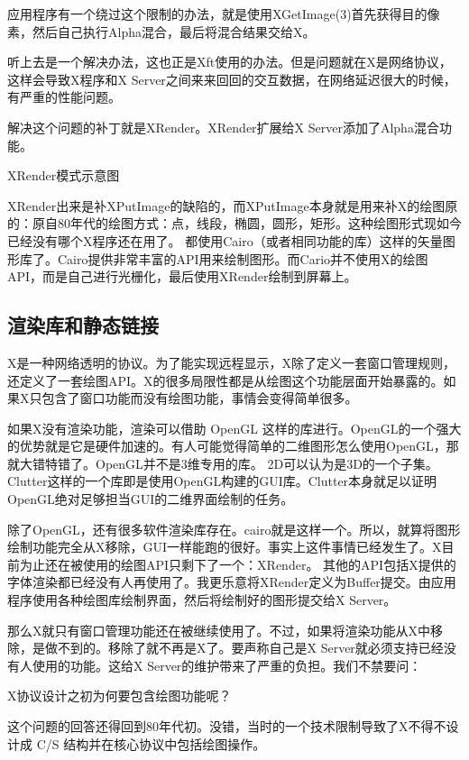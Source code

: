 \documentclass[amstex,twoside]{ctexbook}
\begin{document}
应用程序有一个绕过这个限制的办法，就是使用XGetImage(3)首先获得目的像素，然后自己执行Alpha混合，最后将混合结果交给X。

听上去是一个解决办法，这也正是Xft使用的办法。但是问题就在X是网络协议，这样会导致X程序和X Server之间来来回回的交互数据，在网络延迟很大的时候，有严重的性能问题。

解决这个问题的补丁就是XRender。XRender扩展给X Server添加了Alpha混合功能。


XRender模式示意图

XRender出来是补XPutImage的缺陷的，而XPutImage本身就是用来补X的绘图原的：原自80年代的绘图方式：点，线段，椭圆，圆形，矩形。这种绘图形式现如今已经没有哪个X程序还在用了。
都使用Cairo（或者相同功能的库）这样的矢量图形库了。Cairo提供非常丰富的API用来绘制图形。而Cario并不使用X的绘图API，而是自己进行光栅化，最后使用XRender绘制到屏幕上。


\subsection{渲染库和静态链接}

X是一种网络透明的协议。为了能实现远程显示，X除了定义一套窗口管理规则，还定义了一套绘图API。X的很多局限性都是从绘图这个功能层面开始暴露的。如果X只包含了窗口功能而没有绘图功能，事情会变得简单很多。

如果X没有渲染功能，渲染可以借助 OpenGL 这样的库进行。OpenGL的一个强大的优势就是它是硬件加速的。有人可能觉得简单的二维图形怎么使用OpenGL，那就大错特错了。OpenGL并不是3维专用的库。
2D可以认为是3D的一个子集。Clutter这样的一个库即是使用OpenGL构建的GUI库。Clutter本身就足以证明OpenGL绝对足够担当GUI的二维界面绘制的任务。

除了OpenGL，还有很多软件渲染库存在。cairo就是这样一个。所以，就算将图形绘制功能完全从X移除，GUI一样能跑的很好。事实上这件事情已经发生了。X目前为止还在被使用的绘图API只剩下了一个：XRender。
其他的API包括X提供的字体渲染都已经没有人再使用了。我更乐意将XRender定义为Buffer提交。由应用程序使用各种绘图库绘制界面，然后将绘制好的图形提交给X Server。

那么X就只有窗口管理功能还在被继续使用了。不过，如果将渲染功能从X中移除，是做不到的。移除了就不再是X了。要声称自己是X Server就必须支持已经没有人使用的功能。这给X Server的维护带来了严重的负担。我们不禁要问：

\begin{center}
X协议设计之初为何要包含绘图功能呢？
\end{center}

这个问题的回答还得回到80年代初。没错，当时的一个技术限制导致了X不得不设计成 C/S 结构并在核心协议中包括绘图操作。
\end{document}
